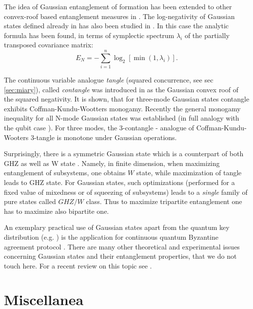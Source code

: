 \documentclass[rmp,12pt,preprint]{revtex4-2}
\begin{document}
The idea of Gaussian entanglement of formation has been extended to
other convex-roof based entanglement measures in
\cite{GNeg_AdeFab}. The log-negativity of Gaussian states defined
already in \cite{Vidal-Werner} has also been studied in
\cite{GNeg_AdeFab}. In this case the analytic formula has been found,
in terms of symplectic spectrum $\lambda_i$ of the partially
transposed covariance matrix:
\begin{equation}
E_N = -\sum_{i=1}^{n}\log_2 [\min(1,\lambda_i)].
\end{equation}

The continuous variable analogue {\it tangle} (squared concurrence, see sec \ref{sec:miary}), called
{\it contangle} was introduced in \cite{GTangle_AdeFab} as the Gaussian convex
roof of the squared negativity. It is shown, that for three-mode
Gaussian states contangle exhibits Coffman-Kundu-Wootters monogamy.
Recently the general monogamy inequality for all N-mode Gaussian states
was established \cite{HiroshimaAI2007} (in full analogy with the qubit case \cite {OsborneV-monogamy}).
For three modes, the 3-contangle  - analogue of Coffman-Kundu-Wooters 3-tangle is monotone under Gaussian operations.

Surprisingly, there is a symmetric Gaussian state which is a
counterpart of both GHZ as well as W state \cite{GTangle_AdeFab}.
Namely, in finite dimension, when maximizing entanglement of
subsystems, one obtains $W$ state, while maximization of tangle leads
to GHZ state. For Gaussian states, such optimizations (performed for a
fixed value of mixedness or of squeezing of subsystems) leads to a
{\it single} family of pure states called $GHZ/W$ class. Thus to
maximize tripartite entanglement one has to maximize also bipartite
one.


An exemplary practical use of Gaussian states apart from the quantum
key distribution (e.g. \cite{Gcrypto_GottesmanPreskill}) is the
application for continuous quantum Byzantine agreement protocol
\cite{GByzant_NeigSan}. There are many  other theoretical and experimental issues
concerning Gaussian states and their entanglement properties,
that we do not touch here. For a recent review on this topic see
\cite{G_review05,AdessoFE2007}.



\section{Miscellanea}
\end{document}
